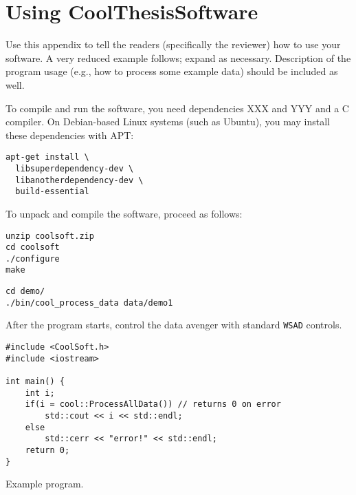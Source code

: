 \chapter{Using CoolThesisSoftware}

Use this appendix to tell the readers (specifically the reviewer) how to use your software. A very reduced example follows; expand as necessary. Description of the program usage (e.g., how to process some example data) should be included as well.

To compile and run the software, you need dependencies XXX and YYY and a C compiler. On Debian-based Linux systems (such as Ubuntu), you may install these dependencies with APT:
\begin{Verbatim}
apt-get install \
  libsuperdependency-dev \
  libanotherdependency-dev \
  build-essential
\end{Verbatim}

To unpack and compile the software, proceed as follows:
\begin{Verbatim}
unzip coolsoft.zip
cd coolsoft
./configure
make
\end{Verbatim}


\begin{Verbatim}
cd demo/
./bin/cool_process_data data/demo1
\end{Verbatim}

After the program starts, control the data avenger with standard \verb-WSAD- controls.

\begin{listing}
\begin{lstlisting}
#include <CoolSoft.h>
#include <iostream>

int main() {
	int i;
	if(i = cool::ProcessAllData()) // returns 0 on error
		std::cout << i << std::endl;
	else
		std::cerr << "error!" << std::endl;
	return 0;
}
\end{lstlisting}
\caption{Example program.}
\label{lst:ex}
\end{listing}
